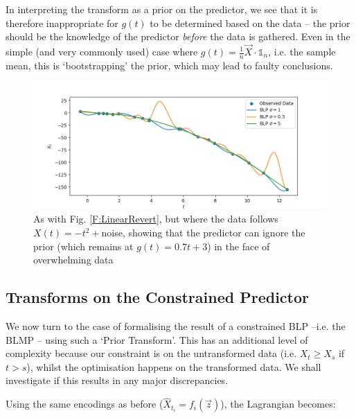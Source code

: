 \documentclass{article}
\newcounter{version}
\begin{document}
			In interpreting the transform as a prior on the predictor, we see that it is therefore inappropriate for $g(t)$ to be determined based on the data -- the prior should be the knowledge of the predictor \textit{before} the data is gathered. Even in the simple (and very commonly used) case where $g(t) = \frac{1}{n} \vec{X} \cdot \mathds{1}_n$, i.e. the sample mean, this is `bootstrapping' the prior, which may lead to faulty conclusions.

			\begin{figure}
				\includegraphics[width=\linewidth,keepaspectratio=true]{Figs/linearReversion_PriorExample.png}
				\caption{As with Fig. \ref{F:LinearRevert}, but where the data follows $X(t) = -t^2 + $noise, showing that the predictor can ignore the prior (which remains at $g(t) = 0.7t+3$) in the face of overwhelming data}\label{F:LinearPrior}
			\end{figure}
	\subsection*{Transforms on the Constrained Predictor}

		We now turn to the case of formalising the result of a constrained BLP --i.e. the BLMP -- using such a `Prior Transform'. This has an additional level of complexity because our constraint is on the untransformed data (i.e. $X_{t} \geq X_s$ if $t>s$), whilst the optimisation happens on the transformed data. We shall investigate if this results in any major discrepancies. 

		Using the same encodings as before ($\hat{X}_{t_i} = f_i(\vec{z})$), the Lagrangian becomes:
\end{document}
